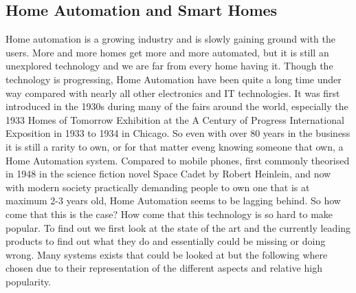 \subsection{Home Automation and Smart Homes}
Home automation is a growing industry and is slowly gaining ground with the users. More and more homes get more and more automated, but it is still an unexplored technology and we are far from every home having it. Though the technology is progressing, Home Automation have been quite a long time under way compared with nearly all other electronics and IT technologies. It was first introduced in the 1930s during many of the fairs around the world, especially the 1933 Homes of Tomorrow Exhibition at the A Century of Progress International Exposition in 1933 to 1934 in Chicago. So even with over 80 years in the business it is still a rarity to own, or for that matter eveng knowing someone that own, a Home Automation system. Compared to mobile phones, first commonly theorised in 1948 in the science fiction novel Space Cadet by Robert Heinlein, and now with modern society practically demanding people to own one that is at maximum 2-3 years old, Home Automation seems to be lagging behind. So how come that this is the case? How come that this technology is so hard to make popular. To find out we first look at the state of the art and the currently leading products to find out what they do and essentially could be missing or doing wrong. Many systems exists that could be looked at but the following where chosen due to their representation of the different aspects and relative high popularity.
